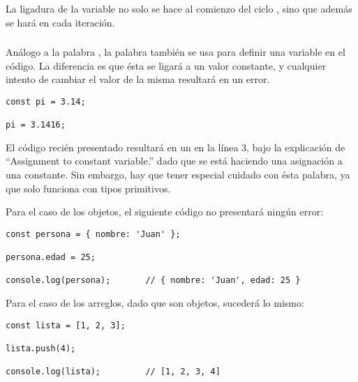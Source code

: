 La ligadura de la variable  no solo se hace al comienzo del ciclo , sino que además se hará en cada iteración.

\subsubsection{}

Análogo a la palabra , la palabra  también se usa para definir una variable en el código. La diferencia es que ésta se ligará a un valor constante, y cualquier intento de cambiar el valor de la misma resultará en un error.

\begin{lstlisting}[title={Intentando cambiar el valor a una constante}]
const pi = 3.14;

pi = 3.1416;
\end{lstlisting}

El código recién presentado resultará en un  en la línea 3, bajo la explicación de "`Assignment to constant variable.​​"' dado que se está haciendo una asignación a una constante. Sin embargo, hay que tener especial cuidado con ésta palabra, ya que solo funciona con tipos primitivos.

Para el caso de los objetos, el siguiente código no presentará ningún error:

\begin{lstlisting}[title={\code{const} sobre objetos}]
const persona = { nombre: 'Juan' };

persona.edad = 25;

console.log(persona);		// ​​​​​{ nombre: 'Juan', edad: 25 }​​​​​
\end{lstlisting}

Para el caso de los arreglos, dado que son objetos, sucederá lo mismo:

\begin{lstlisting}[title={\code{const} sobre arreglos}]
const lista = [1, 2, 3];

lista.push(4);

console.log(lista);			// [1, 2, 3, 4]
\end{lstlisting}